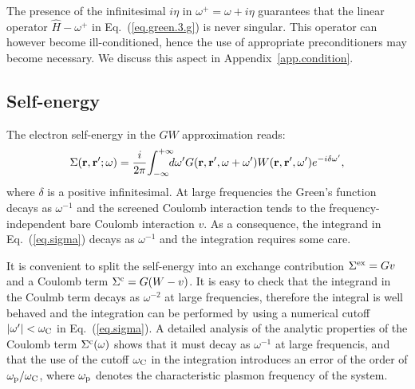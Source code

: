 \documentclass[twocolumn,prb,showpacs,superscriptaddress]{revtex4}
\def\w{\omega}
\def\wp{\omega^\prime}
\def\wc{{\omega_{\rm C}}}
\def\H{\hat{H}}
\def\r{{\bf r}}
\def\rp{{\bf r^\prime}}
\begin{document}
The presence of the infinitesimal $i\eta$ in $\w^+=\w+i\eta$ 
guarantees that the linear operator $\H-\w^+$ in Eq.\ (\ref{eq.green.3.g}) is
never singular.
This operator can however become ill-conditioned, hence the use of appropriate
preconditioners may become necessary. We discuss this aspect 
in Appendix~\ref{app.condition}.

\subsection{Self-energy}\label{sec.sigma}

The electron self-energy in the $GW$ approximation reads:\cite{hl86}
  \begin{equation} \label{eq.sigma}
  \Sigma(\r,\rp;\w) = \frac{i}{2\pi} \! \int_{-\infty}^{+\infty} \!\!\!\!d\wp 
    G(\r,\rp,\w+\wp) W(\r,\rp,\wp) e^{-i\delta\wp},
  \end{equation}
where $\delta$ is a positive infinitesimal. 
At large frequencies the Green's function decays as $\w^{-1}$ and 
the screened Coulomb interaction tends to the frequency-independent
bare Coulomb interaction $v$. As a consequence, the integrand in Eq.\ (\ref{eq.sigma}) 
decays as $\w^{-1}$ and the integration requires some care.

It is convenient to split the self-energy into an exchange contribution 
$\Sigma^{\rm ex}=Gv$ and a Coulomb term $\Sigma^{\rm c}=G(W-v)$.\cite{blochl}
It is easy to check that the integrand in the Coulmb term decays as 
$\w^{-2}$ at large frequencies, therefore the integral is well behaved and the 
integration can be performed by using a numerical cutoff $|\wp|< \wc$ 
in Eq.\ (\ref{eq.sigma}).
A detailed analysis of the analytic properties of the Coulomb term
$\Sigma^{\rm c}(\w)$ shows that it must decay as $\w^{-1}$ 
at large frequencis, and that the use of the cutoff $\wc$ in the integration 
introduces an error of the order of $\w_{\rm p}/\wc$, where $\w_{\rm p}$ denotes
the characteristic plasmon frequency of the system.
\end{document}
